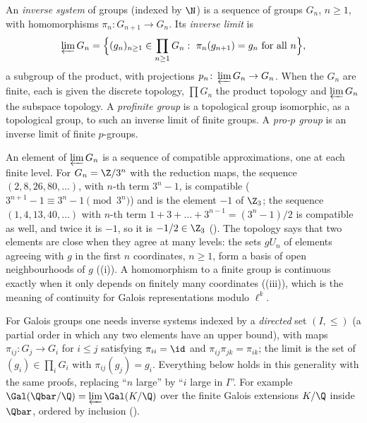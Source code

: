 \begin{definition}\label{def:groups:inverselimit}
An \emph{inverse system} of groups (indexed by $\N$) is a sequence of groups $G_n$, $n\ge1$, with homomorphisms $\pi_n\colon G_{n+1}\to G_n$. Its \emph{inverse limit} is
\[
\varprojlim G_n=\Bigl\{(g_n)_{n\ge1}\in\prod_{n\ge1}G_n:\ \pi_n(g_{n+1})=g_n\text{ for all }n\Bigr\},
\]
a subgroup of the product, with projections $p_n\colon\varprojlim G_n\to G_n$. When the $G_n$ are finite, each is given the discrete topology, $\prod G_n$ the product topology
and $\varprojlim G_n$ the subspace topology. A \emph{profinite group} is a topological group isomorphic, as a topological group, to such an inverse limit of finite groups. A
\emph{pro-$p$ group} is an inverse limit of finite $p$-groups.
\end{definition}

An element of $\varprojlim G_n$ is a sequence of compatible approximations, one at each finite level. For $G_n=\Z/3^n$ with the reduction maps, the sequence
$(2,8,26,80,\dots)$, with $n$-th term $3^n-1$, is compatible ($3^{n+1}-1\equiv3^n-1\pmod{3^n}$) and is the element $-1$ of $\Z_3$; the sequence $(1,4,13,40,\dots)$ with
$n$-th term $1+3+\dots+3^{n-1}=(3^n-1)/2$ is compatible as well, and twice it is $-1$, so it is $-1/2\in\Z_3$ (). The topology says that two elements
are close when they agree at many levels: the sets $gU_n$ of elements agreeing with $g$ in the first $n$ coordinates, $n\ge1$, form a basis of open
neighbourhoods of $g$ ((i)). A homomorphism to a finite
group is continuous exactly when it only depends on finitely many coordinates ((iii)), which is the meaning of continuity for Galois
representations modulo $\ell^k$.

\begin{remark}\label{rem:groups:directed}
For Galois groups one needs inverse systems indexed by a \emph{directed} set $(I,\le)$ (a partial order in which any two elements have an upper bound), with maps
$\pi_{ij}\colon G_j\to G_i$ for $i\le j$ satisfying $\pi_{ii}=\id$ and $\pi_{ij}\pi_{jk}=\pi_{ik}$; the limit is the set of $(g_i)\in\prod_iG_i$ with $\pi_{ij}(g_j)=g_i$. Everything
below holds in this generality with the same proofs, replacing ``$n$ large'' by ``$i$ large in $I$''. For example $\Gal(\Qbar/\Q)=\varprojlim\Gal(K/\Q)$ over the finite Galois
extensions $K/\Q$ inside $\Qbar$, ordered by inclusion ().
\end{remark}

